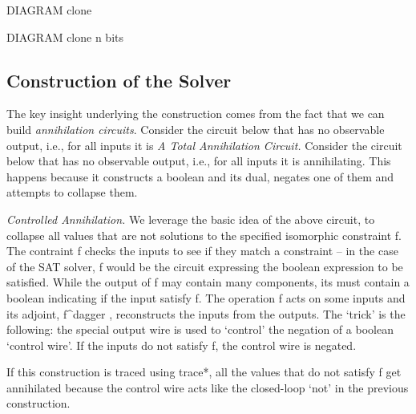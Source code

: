 \documentclass[preprint]{sigplanconf}
\begin{document}
DIAGRAM clone

DIAGRAM clone n bits


\subsection{Construction of the Solver}
The key insight underlying the construction comes from the fact that
we can build \emph{annihilation circuits}.  Consider the circuit below
that has no observable output, i.e., for all inputs it is
\emph{A Total Annihilation Circuit.}  Consider the circuit below that
has no observable output, i.e., for all inputs it is
annihilating. This happens because it constructs a boolean and its
dual, negates one of them and attempts to collapse them.

\begin{center}
\end{center}


\emph{Controlled Annihilation.}  We leverage the basic idea of the
above circuit, to collapse all values that are not solutions to the
specified isomorphic constraint {{f}}.  The contraint {{f}} checks the
inputs to see if they match a constraint -- in the case of the SAT
solver, {{f}} would be the circuit expressing the boolean expression
to be satisfied.  While the output of {{f}} may contain many
components, its must contain a boolean indicating if the input satisfy
{{f}}. The operation {{f}} acts on some inputs and its adjoint,
{{f^{dagger} }}, reconstructs the inputs from the outputs.  The
`trick' is the following: the special output wire is used to `control'
the negation of a boolean `control wire'.  If the inputs do not
satisfy {{f}}, the control wire is negated.

\begin{center}
\end{center}  

If this construction is traced using {{trace*}}, all the values that
do not satisfy {{f}} get annihilated because the control wire acts
like the closed-loop `not' in the previous construction. 
\end{document}
